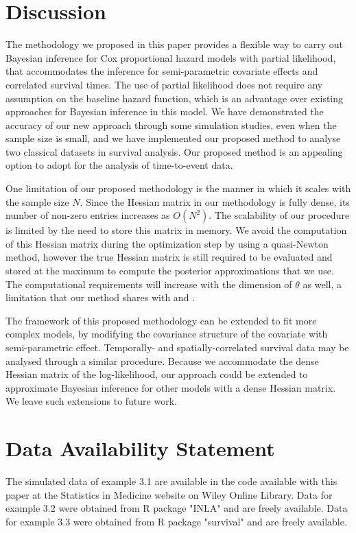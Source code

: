 \documentclass[ba]{imsart}
\begin{document}
\section{Discussion}\label{sec:discussion}

The methodology we proposed in this paper provides a flexible way to carry out Bayesian inference for Cox proportional hazard models with partial likelihood, that accommodates the inference for semi-parametric covariate effects and correlated survival times. The use of partial likelihood does not require any assumption on the baseline hazard function, which is an advantage over existing approaches for Bayesian inference in this model. We have demonstrated the accuracy of our new approach through some simulation studies, even when the sample size is small, and we have implemented our proposed method to analyse two classical datasets in survival analysis. Our proposed method is an appealing option to adopt for the analysis of time-to-event data.

One limitation of our proposed methodology is the manner in which it scales with the sample size $N$. Since the Hessian matrix in our methodology is fully dense, its number of non-zero entries increases as $O(N^{2})$. The scalability of our procedure is limited by the need to store this matrix in memory. We avoid the computation of this Hessian matrix during the optimization step by using a quasi-Newton method, however the true Hessian matrix is still required to be evaluated and stored at the maximum to compute the posterior approximations that we use. The computational requirements will increase with the dimension of $\theta$ as well, a limitation that our method shares with \citet{inla} and \cite{casecross}.

The framework of this proposed methodology can be extended to fit more complex models, by modifying the covariance structure of the covariate with semi-parametric effect. Temporally- and spatially-correlated survival data may be analysed through a similar procedure. Because we accommodate the dense Hessian matrix of the log-likelihood, our approach could be extended to approximate Bayesian inference for other models with a dense Hessian matrix. We leave such extensions to future work.

\section*{Data Availability Statement}
The simulated data of example 3.1 are available in the code available with this paper at the Statistics in Medicine website on Wiley Online Library.
Data for example 3.2 were obtained from R package "INLA" \citep{inla} and are freely available.
Data for example 3.3 were obtained from R package "survival" \citep{survival-package} and are freely available. 
\end{document}
